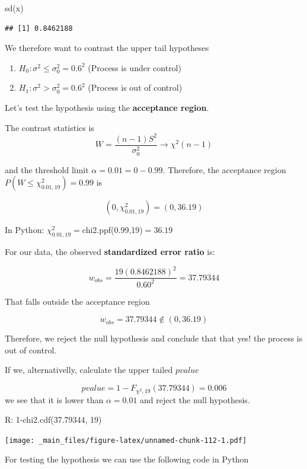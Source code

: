 \documentclass[
]{book}
\newenvironment{Shaded}{\begin{snugshade}}{\end{snugshade}}
\newcommand{\FunctionTok}[1]{\textcolor[rgb]{0.00,0.00,0.00}{#1}}
\newcommand{\NormalTok}[1]{#1}
\providecommand{\tightlist}{%
  \setlength{\itemsep}{0pt}\setlength{\parskip}{0pt}}
\begin{document}
\begin{Shaded}
\begin{Highlighting}[]
\FunctionTok{sd}\NormalTok{(x)}
\end{Highlighting}
\end{Shaded}

\begin{verbatim}
## [1] 0.8462188
\end{verbatim}

We therefore want to contrast the upper tail hypotheses

\begin{enumerate}
\def\labelenumi{\alph{enumi}.}
\tightlist
\item
  \(H_0:\sigma^2 \leq \sigma_0^2=0.6^2\) (Process is under control)
\item
  \(H_1:\sigma^2 > \sigma_0^2=0.6^2\) (Process is out of control)
\end{enumerate}

Let's test the hypothesis using the \textbf{acceptance region}.

The contrast statistics is \[W=\frac{(n-1)S^2}{\sigma_0^2} \rightarrow \chi^2(n-1)\]

and the threshold limit \(\alpha=0.01=0-0.99\). Therefore, the acceptance region \(P(W\leq \chi^2_{0.01,19})=0.99\) is

\[(0, \chi^2_{0.01,19})=(0,36.19)\]

In Python: \(\chi^2_{0.01,19}=\)chi2.ppf(0.99,19)\(= 36.19\)

For our data, the observed \textbf{standardized error ratio} is:

\[w_{obs}=\frac{19 (0.8462188)^2}{0.60^2}=37.79344\]

That falls outside the acceptance region

\[w_{obs}=37.79344\notin (0,36.19)\]

Therefore, we reject the null hypothesis and conclude that that yes! the process is out of control.

If we, alternativelly, calculate the upper tailed \(pvalue\)

\[pvalue=1-F_{\chi^2,19}(37.79344)= 0.006\]
we see that it is lower than \(\alpha=0.01\) and reject the null hypothesis.

R: 1-chi2.cdf(37.79344, 19)

\texttt{[image: \_main\_files/figure-latex/unnamed-chunk-112-1.pdf]}

For testing the hypothesis we can use the following code in Python
\end{document}
